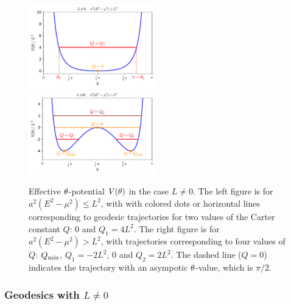 \begin{figure}
\centerline{\includegraphics[width=0.49\textwidth]{gek_th_pot_high_L.pdf}
\ \includegraphics[width=0.49\textwidth]{gek_th_pot_low_L.pdf}}
\caption[]{\label{f:gek:th_pot_L_non0} \footnotesize
Effective $\theta$-potential $V(\theta)$ in the case $L\neq0$.
The left figure is for $a^2(E^2 - \mu^2) \leq L^2$, with
with colored dots or horizontal lines
corresponding to geodesic trajectories for
two values of the Carter constant $Q$: $0$ and $Q_1= 4 L^2$.
The right figure is for $a^2(E^2 - \mu^2) > L^2$, with trajectories corresponding
to four values of $Q$: $Q_{\rm min}$, $Q_1 = - 2 L^2$, $0$ and $Q_2 = 2 L^2$.
The dashed line ($Q=0$)
indicates the trajectory with an asympotic $\theta$-value, which is $\pi/2$.
}
\end{figure}


\subsubsection{Geodesics with $L\not=0$}

